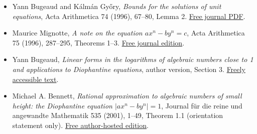 \documentclass[
  11pt,
  a4paper,
]{article}
\providecommand{\tightlist}{%
  \setlength{\itemsep}{0pt}\setlength{\parskip}{0pt}}
\begin{document}
\begin{itemize}
\tightlist
\item
  Yann Bugeaud and Kálmán Győry, \emph{Bounds for the solutions of unit
  equations}, Acta Arithmetica 74 (1996), 67--80, Lemma 2.
  \href{https://matwbn.icm.edu.pl/ksiazki/aa/aa74/aa7416.pdf}{Free
  journal PDF}.
\item
  Maurice Mignotte, \emph{A note on the equation \(ax^n-by^n=c\)}, Acta
  Arithmetica 75 (1996), 287--295, Theorems 1--3.
  \href{https://www.impan.pl/shop/en/publication/transaction/download/product/109013}{Free
  journal edition}.
\item
  Yann Bugeaud, \emph{Linear forms in the logarithms of algebraic
  numbers close to 1 and applications to Diophantine equations}, author
  version, Section 3.
  \href{https://irma.math.unistra.fr/~bugeaud/travaux/ConfMumbaidef.pdf}{Freely
  accessible text}.
\item
  Michael A. Bennett, \emph{Rational approximation to algebraic numbers
  of small height: the Diophantine equation \(|ax^n-by^n|=1\)}, Journal
  für die reine und angewandte Mathematik 535 (2001), 1--49, Theorem 1.1
  (orientation statement only).
  \href{https://personal.math.ubc.ca/~bennett/B-Crelle2.pdf}{Free
  author-hosted edition}.
\end{itemize}
\end{document}
